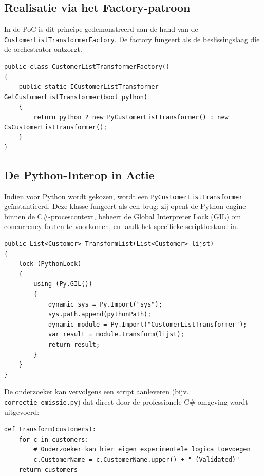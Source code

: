 \subsection{Realisatie via het Factory-patroon}
{\sloppy In de PoC is dit principe gedemonstreerd aan de hand van de \nolinkurl{CustomerListTransformerFactory}. De factory fungeert als de beslissingslaag die de orchestrator ontzorgt. \par}

\begin{listing}[ht]
\begin{verbatim}
public class CustomerListTransformerFactory()
{
    public static ICustomerListTransformer GetCustomerListTransformer(bool python)
    {
        return python ? new PyCustomerListTransformer() : new CsCustomerListTransformer();
    }
}
\end{verbatim}
\caption{Factory voor het dynamisch wisselen tussen C\# en Python implementaties.}
\label{lst:factory_poc}
\end{listing}

\subsection{De Python-Interop in Actie}
Indien voor Python wordt gekozen, wordt een \texttt{PyCustomerListTransformer} geïnstantieerd. Deze klasse fungeert als een brug: zij opent de Python-engine binnen de C\#-procescontext, beheert de Global Interpreter Lock (GIL) om concurrency-fouten te voorkomen, en laadt het specifieke scriptbestand in.

\begin{listing}[ht]
\begin{verbatim}
public List<Customer> TransformList(List<Customer> lijst)
{
    lock (PythonLock)
    {
        using (Py.GIL())
        {
            dynamic sys = Py.Import("sys");
            sys.path.append(pythonPath);
            dynamic module = Py.Import("CustomerListTransformer");
            var result = module.transform(lijst);
            return result;
        }
    }
}
\end{verbatim}
\caption{C\#-methode die via Python.NET een extern script aanroept.}
\label{lst:py_transformer_poc}
\end{listing}

De onderzoeker kan vervolgens een script aanleveren (bijv. \nolinkurl{correctie\_emissie.py}) dat direct door de professionele C\#-omgeving wordt uitgevoerd:

\begin{listing}[ht]
\begin{verbatim}
def transform(customers):
    for c in customers:
        # Onderzoeker kan hier eigen experimentele logica toevoegen
        c.CustomerName = c.CustomerName.upper() + " (Validated)"
    return customers
\end{verbatim}
\caption{Voorbeeld van een Python-script voor experimentele modelaanpassingen.}
\label{lst:py_script_poc}
\end{listing}

